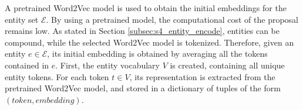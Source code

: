 \begin{table} 
\centering
{}
\caption{Triple classification average precision, recall, and F1 score with and without entity initialization}
\label{tab:exp_entity_init}
\end{table}

A pretrained Word2Vec model \citep{GoogleNewsMethod} is used to obtain the initial embeddings for the entity set $\mathcal{E}$. By using a pretrained model, the computational cost of the proposal remains low. As stated in Section \ref{subsec:s4_entity_encode}, entities can be compound, while the selected Word2Vec model is tokenized. Therefore, given an entity $e \in \mathcal{E}$, its initial embedding is obtained by averaging all the tokens contained in $e$. First, the entity vocabulary $V$ is created, containing all unique entity tokens. For each token $t \in V$, its representation is extracted from the pretrained Word2Vec model, and stored in a dictionary of tuples of the form $(token, embedding)$.

